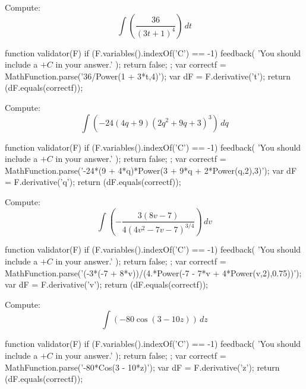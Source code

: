 \documentclass{ximera}
\renewcommand{\d}{\, d}
\begin{document}
\begin{exercise}
Compute: 
\[
\int \left(\frac{36}{(3 t+1)^4}\right)\d t
\]
\begin{expressionAnswer}
     function validator(F) {
      if (F.variables().indexOf('C') == -1) {
        feedback( 'You should include a $+C$ in your answer.' );
        return false;
      };      
      var correctf = MathFunction.parse('36/Power(1 + 3*t,4)');
      var dF = F.derivative('t');
      return (dF.equals(correctf));
    }
\end{expressionAnswer}
\end{exercise}



\begin{exercise}
Compute: 
\[
\int \left(-24 (4 q+9) \left(2 q^2+9 q+3\right)^3\right)\d q
\]
\begin{expressionAnswer}
     function validator(F) {
      if (F.variables().indexOf('C') == -1) {
        feedback( 'You should include a $+C$ in your answer.' );
        return false;
      };      
      var correctf = MathFunction.parse('-24*(9 + 4*q)*Power(3 + 9*q + 2*Power(q,2),3)');
      var dF = F.derivative('q');
      return (dF.equals(correctf));
    }
\end{expressionAnswer}
\end{exercise}



\begin{exercise}
Compute: 
\[
\int \left(-\frac{3 (8 v-7)}{4 \left(4 v^2-7 v-7\right)^{3/4}}\right)\d v
\]
\begin{expressionAnswer}
     function validator(F) {
      if (F.variables().indexOf('C') == -1) {
        feedback( 'You should include a $+C$ in your answer.' );
        return false;
      };      
      var correctf = MathFunction.parse('(-3*(-7 + 8*v))/(4.*Power(-7 - 7*v + 4*Power(v,2),0.75))');
      var dF = F.derivative('v');
      return (dF.equals(correctf));
    }
\end{expressionAnswer}
\end{exercise}



\begin{exercise}
Compute: 
\[
\int \left(-80 \cos (3-10 z)\right)\d z
\]
\begin{expressionAnswer}
     function validator(F) {
      if (F.variables().indexOf('C') == -1) {
        feedback( 'You should include a $+C$ in your answer.' );
        return false;
      };      
      var correctf = MathFunction.parse('-80*Cos(3 - 10*z)');
      var dF = F.derivative('z');
      return (dF.equals(correctf));
    }
\end{expressionAnswer}
\end{exercise}
\end{document}
